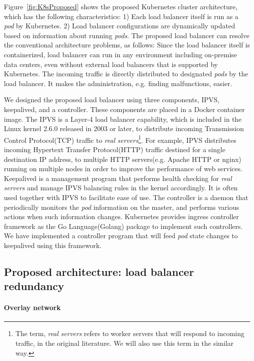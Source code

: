 Figure~\ref{fig:K8sProposed} shows the proposed  Kubernetes cluster architecture, 
which has the following characteristics:
1) Each load balancer itself is run as a {\em pod} by Kubernetes. 
2) Load balancer configurations are dynamically updated based on information about running {\em pods}.
The proposed load balancer can resolve the conventional architecture problems, as follows:
Since the load balancer itself is containerized, load balancer can run in any environment including on-premise data centers, 
even without external load balancers that is supported by Kubernetes.
The incoming traffic is directly distributed to designated {\em pods} by the load balancer. 
It makes the administration, e.g. finding malfunctions, easier.

We designed the proposed load balancer using three components, IPVS, keepalived, and a controller. 
These components are placed in a Docker container image.
The IPVS is a Layer-4 load balancer capability, which is included in the Linux kernel 2.6.0 released in 2003 or later, 
to distribute incoming Transmission Control Protocol(TCP) traffic to 
{\em real servers}\footnote{The term, {\em real servers} refers to worker servers that will respond to incoming traffic, 
in the original literature\cite{Zhang2000}. We will also use this term in the similar way.}\cite{Zhang2000}. 
For example, IPVS distributes incoming Hypertext Transfer Protocol(HTTP) traffic destined for a single destination IP address, 
to multiple HTTP servers(e.g. Apache HTTP or nginx) running on multiple nodes in order to improve the performance of web services.
Keepalived is a management program that performs health checking for {\em real servers}
and manage IPVS balancing rules in the kernel accordingly.
It is often used together with IPVS to facilitate ease of use.
The controller is a daemon that periodically monitors the {\em pod} information on the master, 
and performs various actions when such information changes.
Kubernetes provides ingress controller framework as the Go Language(Golang) package to implement such controllers. 
We have implemented a controller program that will feed {\em pod} state changes to keepalived 
using this framework. 

\subsection{Proposed architecture: load balancer redundancy}

\paragraph{\bf Overlay network}

